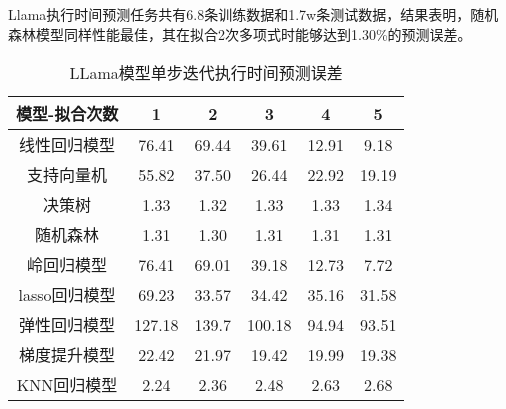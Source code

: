 Llama执行时间预测任务共有6.8条训练数据和1.7w条测试数据，结果表明，随机森林模型同样性能最佳，其在拟合2次多项式时能够达到1.30\%的预测误差。

\begin{table}[H]
  \centering
  \caption{LLama模型单步迭代执行时间预测误差}
  \label{Table:LLama模型单步迭代执行时间预测误差}
  \renewcommand{\arraystretch}{1.25}
  \small
  \begin{tabular}{c c c c c c}
    \toprule
    \textbf{模型-拟合次数} & \textbf{1} & \textbf{2} & \textbf{3} & \textbf{4} & \textbf{5} \\
    \midrule
    线性回归模型 & 76.41 & 69.44 & 39.61 & 12.91 & 9.18 \\ 
    支持向量机 & 55.82 & 37.50 & 26.44 & 22.92 & 19.19 \\ 
    决策树 & 1.33 & 1.32 & 1.33 & 1.33 & 1.34 \\ 
    随机森林 & 1.31 & 1.30 & 1.31 & 1.31 & 1.31 \\ 
    岭回归模型 & 76.41 & 69.01 & 39.18 & 12.73 & 7.72 \\ 
    lasso回归模型 & 69.23 & 33.57 & 34.42 & 35.16 & 31.58  \\ 
    弹性回归模型 & 127.18 & 139.7 & 100.18 & 94.94 & 93.51  \\ 
    梯度提升模型 & 22.42 & 21.97 & 19.42 & 19.99 & 19.38  \\ 
    KNN回归模型 & 2.24 & 2.36 & 2.48 & 2.63 & 2.68 \\ 
    \bottomrule
  \end{tabular}
\end{table}




